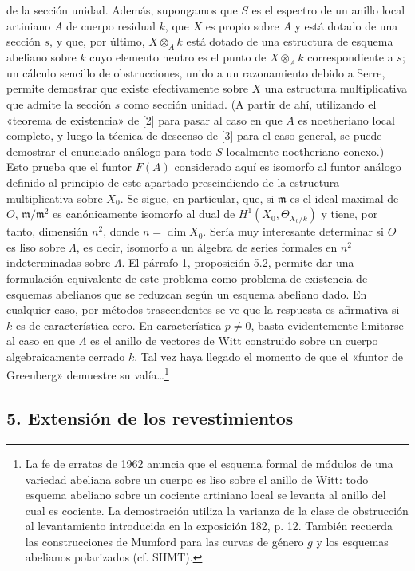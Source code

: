 \documentclass[11pt,twoside,openany]{book}
\numberwithin{equation}{section}
\newcommand{\src}[1]{%
  \phantomsection\hypertarget{src:#1}{}%
  \marginpar{\raggedleft\footnotesize\sffamily #1}%
}
\theoremstyle{plain}
\theoremstyle{definition}
\theoremstyle{remark}
\newcommand{\FgaUnitKey}{frontmatter}
\renewcommand{\src}[1]{%
  \phantomsection\hypertarget{src:\FgaUnitKey:#1}{}%
  \marginpar{\raggedleft\footnotesize\sffamily #1}%
}
\theoremstyle{plain}
\theoremstyle{definition}
\theoremstyle{remark}
\begin{document}
\src{387}
de la sección unidad. Además, supongamos que $S$ es el espectro de un anillo
local artiniano $A$ de cuerpo residual $k$, que $X$ es propio sobre $A$ y está
dotado de una sección $s$, y que, por último, $X\otimes_Ak$ está dotado de una
estructura de esquema abeliano sobre $k$ cuyo elemento neutro es el punto de
$X\otimes_Ak$ correspondiente a $s$; un cálculo sencillo de obstrucciones,
unido a un razonamiento debido a Serre, permite demostrar que existe
efectivamente sobre $X$ una estructura multiplicativa que admite la sección
$s$ como sección unidad. (A partir de ahí, utilizando el «teorema de
existencia» de [2] para pasar al caso en que $A$ es noetheriano local completo,
y luego la técnica de descenso de [3] para el caso general, se puede demostrar
el enunciado análogo para todo $S$ localmente noetheriano conexo.) Esto prueba
que el funtor $F(A)$ considerado aquí es isomorfo al funtor análogo definido al
principio de este apartado prescindiendo de la estructura multiplicativa sobre
$X_0$. Se sigue, en particular, que, si $\mathfrak m$ es el ideal maximal de
$O$, $\mathfrak m/\mathfrak m^2$ es canónicamente isomorfo al dual de
$H^1(X_0,\Theta_{X_0/k})$ y tiene, por tanto, dimensión $n^2$, donde
$n=\dim X_0$. Sería muy interesante determinar si $O$ es liso sobre $\Lambda$,
es decir, isomorfo a un álgebra de series formales en $n^2$ indeterminadas
sobre $\Lambda$. El párrafo 1, proposición 5.2, permite dar una formulación
equivalente de este problema como problema de existencia de esquemas abelianos
que se reduzcan según un esquema abeliano dado. En cualquier caso, por métodos
trascendentes se ve que la respuesta es afirmativa si $k$ es de característica
cero. En característica $p\ne0$, basta evidentemente limitarse al caso en que
$\Lambda$ es el anillo de vectores de Witt construido sobre un cuerpo
algebraicamente cerrado $k$. Tal vez haya llegado el momento de que el «funtor
de Greenberg» demuestre su valía\ldots\footnote{La fe de erratas de 1962
anuncia que el esquema formal de módulos de una variedad abeliana sobre un
cuerpo es liso sobre el anillo de Witt: todo esquema abeliano sobre un cociente
artiniano local se levanta al anillo del cual es cociente. La demostración
utiliza la varianza de la clase de obstrucción al levantamiento introducida en
la exposición 182, p. 12. También recuerda las construcciones de Mumford para
las curvas de género $g$ y los esquemas abelianos polarizados (cf. SHMT).}

\subsection*{5. Extensión de los revestimientos}
\end{document}
